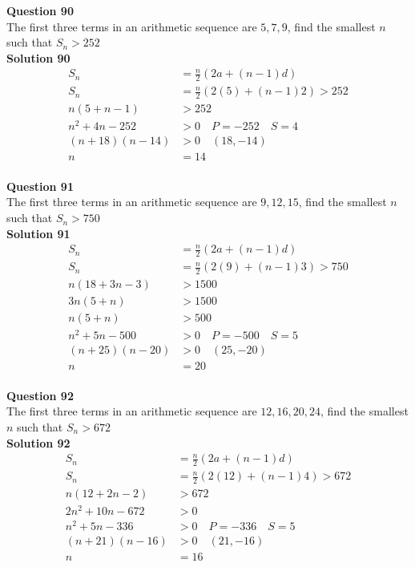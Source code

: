 \documentclass{article}
\begin{document}
\noindent\textbf{Question 90}\\[5pt]
The first three terms in an arithmetic sequence are $5,7,9$, find the smallest $n$ such that $S_n > 252$\\[5pt]
\noindent\textbf{Solution 90}\\[5pt]
\begin{align*}
S_n&=\displaystyle\frac{n}{2}(2a+(n-1)d)\\[2pt]
S_n&=\displaystyle\frac{n}{2}(2(5)+(n-1)2)>252\\[2pt]
n(5+n-1)&>252\\[2pt]
n^2+4n-252&>0 \quad P=-252\quad S=4\\[2pt]
(n+18)(n-14)&>0 \quad (18,-14)\\[2pt]
n&=14
\end{align*}\\[10pt]

\noindent\textbf{Question 91}\\[5pt]
The first three terms in an arithmetic sequence are $9,12,15$, find the smallest $n$ such that $S_n > 750$\\[5pt]
\noindent\textbf{Solution 91}\\[5pt]
\begin{align*}
S_n&=\displaystyle\frac{n}{2}(2a+(n-1)d)\\[2pt]
S_n&=\displaystyle\frac{n}{2}(2(9)+(n-1)3)>750\\[2pt]
n(18+3n-3)&>1500\\[2pt]
3n(5+n)&>1500\\[2pt]
n(5+n)&>500\\[2pt]
n^2+5n-500&>0 \quad P=-500\quad S=5\\[2pt]
(n+25)(n-20)&>0 \quad (25,-20)\\[2pt]
n&=20
\end{align*}\\[10pt]

\noindent\textbf{Question 92}\\[5pt]
The first three terms in an arithmetic sequence are $12,16,20,24$, find the smallest $n$ such that $S_n > 672$\\[5pt]
\noindent\textbf{Solution 92}\\[5pt]
\begin{align*}
S_n&=\displaystyle\frac{n}{2}(2a+(n-1)d)\\[2pt]
S_n&=\displaystyle\frac{n}{2}(2(12)+(n-1)4)>672\\[2pt]
n(12+2n-2)&>672\\[2pt]
2n^2+10n-672&>0\\[2pt]
n^2+5n-336&>0 \quad P=-336\quad S=5\\[2pt]
(n+21)(n-16)&>0 \quad (21,-16)\\[2pt]
n&=16
\end{align*}\\[10pt]
\end{document}
